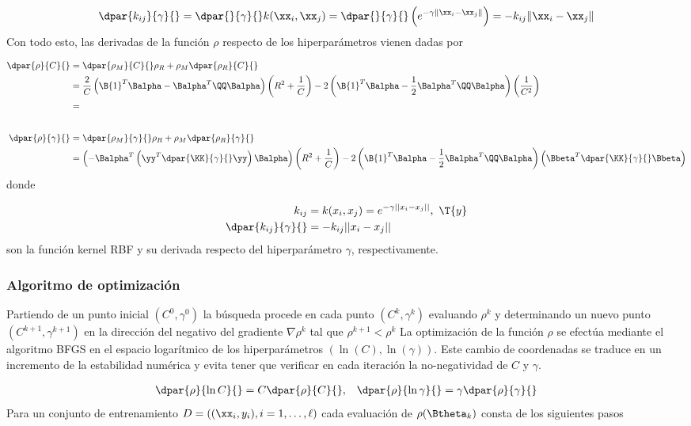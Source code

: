 \begin{align}
  \dpar{k_{ij}}{\gamma}{}
  = \dpar{}{\gamma}{}k(\xx_i,\xx_j)
  = \dpar{}{\gamma}{} \left(e^{-\gamma\|\xx_i-\xx_j\|}\right)
  = -k_{ij}\|\xx_i-\xx_j\|
\end{align}
Con todo esto, las derivadas de la función $\rho$ respecto de los
hiperparámetros vienen dadas por

\begin{align*}
    \dpar{\rho}{C}{} &= \dpar{\rho_M}{C}{} \rho_R + \rho_M \dpar{\rho_R}{C}{} \\
    &= \frac{2}{C} \left(\B{1}^T\Balpha - \Balpha^T\QQ\Balpha\right) \left( R^2 + \frac{1}{C} \right)
    - 2\left(  \B{1}^T\Balpha-\frac{1}{2}\Balpha^T\QQ\Balpha \right)
    \left( \frac{1}{C^2} \right)\\
    &=
  \\[2em]
    \dpar{\rho}{\gamma}{} &= \dpar{\rho_M}{\gamma}{} \rho_R + \rho_M \dpar{\rho_R}{\gamma}{}\\
    &= \left( - \Balpha^T \left(\yy^T \dpar{\KK}{\gamma}{}\yy\right) \Balpha \right)
    \left( R^2 + \frac{1}{C} \right)
    - 2\left(  \B{1}^T\Balpha-\frac{1}{2}\Balpha^T\QQ\Balpha \right)
    \left( \Bbeta^T \dpar{\KK}{\gamma}{} \Bbeta \right)
\end{align*}
donde

\begin{align}
  k_{ij}&=k(x_i,x_j)=e^{-\gamma||x_i-x_j||},\,\, \T{y} \\
  \dpar{k_{ij}}{\gamma}{}&=-k_{ij}||x_i-x_j||
\end{align}
son la función kernel RBF y su derivada respecto del hiperparámetro $\gamma$,
respectivamente.

\subsubsection{Algoritmo de optimización}
Partiendo de un punto inicial $(C^0,\gamma^0)$ la búsqueda procede
en cada punto $(C^k,\gamma^k)$ evaluando $\rho^k$ y determinando
un nuevo punto $(C^{k+1},\gamma^{k+1})$ en la dirección del
negativo del gradiente $\nabla\rho^k$ tal que $\rho^{k+1}<\rho^k$
La optimización de la función $\rho$ se efectúa mediante el algoritmo
BFGS \cite{bfgs} en el espacio logarítmico de los hiperparámetros
$(\ln(C),\ln(\gamma))$. Este cambio de coordenadas se traduce en un
incremento de la estabilidad numérica y evita tener que verificar en
cada iteración la no-negatividad de $C$ y $\gamma$.

\begin{align}
  \dpar{\rho}{\ln C}{}= C \dpar{\rho}{C}{}, &&
  \dpar{\rho}{\ln \gamma}{}= \gamma \dpar{\rho}{\gamma}{}
\end{align}
Para un conjunto de entrenamiento $D=((\xx_i,y_i),i=1,\ldots,\ell)$
cada evaluación de $\rho(\Btheta_k)$ consta de los siguientes pasos

